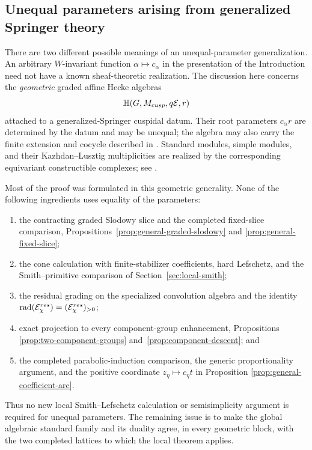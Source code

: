 \documentclass[10pt,a4paper]{amsart}
\begin{document}
\subsection{Unequal parameters arising from generalized Springer theory}

There are two different possible meanings of an unequal-parameter
generalization.  An arbitrary $W$-invariant function
$\alpha\mapsto c_\alpha$ in the presentation of the Introduction need not
have a known sheaf-theoretic realization.  The discussion here concerns the
\emph{geometric} graded affine Hecke algebras
\[
 \mathbb H(G,M_{\rm cusp},q\mathcal E,r)
\]
attached to a generalized-Springer cuspidal datum.  Their root parameters
$c_\alpha r$ are determined by the datum and may be unequal; the algebra may
also carry the finite extension and cocycle described in
\cite[Section~2]{AMS}.  Standard modules, simple modules, and their
Kazhdan--Lusztig multiplicities are realized by the corresponding equivariant
constructible complexes; see \cite[Sections~2--5]{Solleveld}.

Most of the proof was formulated in this geometric generality.  None of the
following ingredients uses equality of the parameters:
\begin{enumerate}[label=\textup{(G\arabic*)},leftmargin=2.8em]
\item the contracting graded Slodowy slice and the completed fixed-slice
comparison, Propositions~\ref{prop:general-graded-slodowy} and
\ref{prop:general-fixed-slice};
\item the cone calculation with finite-stabilizer coefficients, hard
Lefschetz, and the Smith--primitive comparison of
Section~\ref{sec:local-smith};
\item the residual grading on the specialized convolution algebra and the
identity
$\operatorname{rad}(\mathcal E_\chi^{\rm res})
=(\mathcal E_\chi^{\rm res})_{>0}$;
\item exact projection to every component-group enhancement, Propositions
\ref{prop:two-component-groups} and~\ref{prop:component-descent}; and
\item the completed parabolic-induction comparison, the generic
proportionality argument, and the positive coordinate
$z_\eta\mapsto c_\eta t$ in Proposition
\ref{prop:general-coefficient-arc}.
\end{enumerate}
Thus no new local Smith--Lefschetz calculation or semisimplicity argument is
required for unequal parameters.  The remaining issue is to make
the global algebraic standard family and its duality agree, in every
geometric block, with the two completed lattices to which the local theorem
applies.
\end{document}
